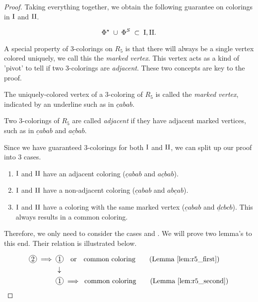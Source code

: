 \begin{proof}
Taking everything together, we obtain the following guarantee on colorings in $\text{I}$ and $\text{II}$.

\begin{equation}
    \Phi^\star\; \cup \;\Phi^S \;\subset\; \text{I}, \text{II}.
\end{equation}

A special property of 3-colorings on $R_5$ is that there will always be a single vertex colored uniquely, we call this the \textit{marked vertex}. This vertex acts as a kind of 'pivot' to tell if two 3-colorings are \textit{adjacent}. These two concepts are key to the proof.

\begin{definition}
    The uniquely-colored vertex of a 3-coloring of $R_5$ is called the \emph{marked vertex}, indicated by an underline such as in $\underline{c}abab$.
\end{definition}

\begin{definition}
    Two 3-colorings of $R_5$ are called \emph{adjacent} if they have adjacent marked vertices, such as in $\underline{c}abab$ and $a\underline{c}bab$.
\end{definition}

Since we have guaranteed 3-colorings for both $\text{I}$ and $\text{II}$, we can split up our proof into 3 cases.

\begin{enumerate}
    \item $\text{I}$ and $\text{II}$ have an adjacent coloring ($\underline{c}abab$ and $a\underline{c}bab$).
    \item $\text{I}$ and $\text{II}$ have a non-adjacent coloring ($\underline{c}abab$ and $ab\underline{c}ab$).
    \item $\text{I}$ and $\text{II}$ have a coloring with the same marked vertex ($\underline{c}abab$ and $\underline{d}cbcb$). This always results in a common coloring.
\end{enumerate}

Therefore, we only need to consider the cases  and . We will prove two lemma's to this end. Their relation is illustrated below.

\begin{equation*}
    \begin{aligned}
    \circled{2} \implies\; &\circled{1}\quad \text{or} \quad \text{common coloring} \quad\quad \text{(Lemma \ref{lem:r5_first})} \\
    &\downarrow \\
    &\circled{1} \implies\;\text{common coloring}\quad\quad \text{(Lemma \ref{lem:r5_second})}
    \end{aligned}
\end{equation*}


\end{proof}
